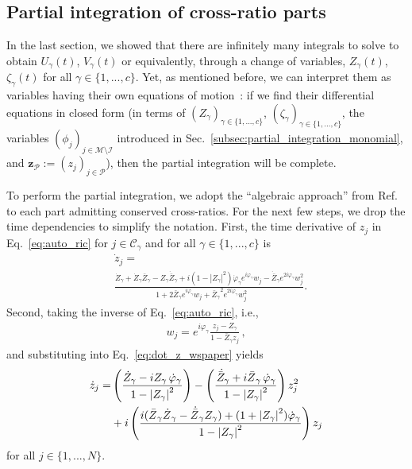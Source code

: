 \documentclass[aps,pre,reprint,longbibliography,superscriptaddress,noshowpacs,floatfix]{revtex4-2}
\theoremstyle{definition}
\theoremstyle{remark}
\newcommand*{\sbar}{\skew{3}{\bar}}
\newcommand*{\sdot}{\skew{3}{\dot}}
\begin{document}
\subsection{Partial integration of cross-ratio parts}
\label{subsec:partial_integration_crossratio}

In the last section, we showed that there are infinitely many integrals to solve to obtain $U_{\gamma}(t)$, $V_{\gamma}(t)$ or equivalently, through a change of variables, $Z_{\gamma}(t)$, $\zeta_{\gamma}(t)$ for all $\gamma \in \{1,...,c\}$. Yet, as mentioned before, we can interpret them as variables having their own equations of motion~: if we find their differential equations in closed form (in terms of $(Z_{\gamma})_{\gamma\in\{1,...,c\}}$, $(\zeta_{\gamma})_{\gamma\in\{1,...,c\}}$, the variables $(\phi_j)_{j\in\mathcal{M}\setminus\mathcal{I}}$ introduced in Sec.~\ref{subsec:partial_integration_monomial}, and  $\bm{z}_{\mathcal{P}} := (z_j)_{j\in \mathcal{P}}$), then the partial integration will be complete.

To perform the partial integration, we adopt the ``algebraic approach'' from Ref.~\cite{Marvel2009} to each part admitting conserved cross-ratios. For the next few steps, we drop the time dependencies to simplify the notation. First, the time derivative of $z_j$ in Eq.~\eqref{eq:auto_ric} for $j \in \mathcal{C}_\gamma$ and for all $\gamma \in\{1,...,c\}$ is
\begin{align}\label{eq:dot_z_wspaper}
    &\dot{z}_j = \nonumber\\&\frac{\dot{Z}_{\gamma} + \dot{Z}_{\gamma}\bar{Z}_{\gamma} - Z_{\gamma}\dot{\bar{Z}}_{\gamma} + i(1-|Z_{\gamma}|^2)\dot{\varphi}_{\gamma}e^{i\varphi_{\gamma}}w_j - \dot{\bar{Z}}_{\gamma}e^{2i\varphi_{\gamma}}w_j^2}{1 + 2 \bar{Z}_{\gamma}e^{i\varphi_{\gamma}}w_j + {\bar{Z}_{\gamma}}^2e^{2i\varphi_{\gamma}}w_j^2\phantom{\sum^{N}}}. 
\end{align}
Second, taking the inverse of Eq.~\eqref{eq:auto_ric}, i.e.,
\begin{align}\label{eq:wj}
    w_j = e^{i\varphi_{\gamma}}\frac{z_j - Z_{\gamma}}{1 - \bar{Z}_{\gamma}z_j}\,, %
\end{align}
and substituting into Eq.~\eqref{eq:dot_z_wspaper} yields
\begin{align}
    \dot{z}_j = &\left(\frac{\dot{Z}_{\gamma} - iZ_{\gamma}\,\dot{\varphi}_{\gamma}}{1 - \left|Z_{\gamma}\right|^2} \right) -\left(\frac{\sdot{\bar{Z}}_{\gamma} +i\sbar{Z}_{\gamma}\,\dot{\varphi}_{\gamma}}{1 - \left|Z_{\gamma}\right|^2}\right)z_j^2 \label{eq:} \\&+ i\left(\frac{i(\sbar{Z}_{\gamma}\sdot{Z}_{\gamma}-\sdot{\sbar{Z}}_{\gamma}Z_{\gamma}) + (1 + \left|Z_{\gamma}\right|^2)\dot{\varphi}_{\gamma}}{1 - \left|Z_{\gamma}\right|^2}\right)z_j \nonumber
\end{align}
for all $j\in\{1,...,N\}$. 
\end{document}
